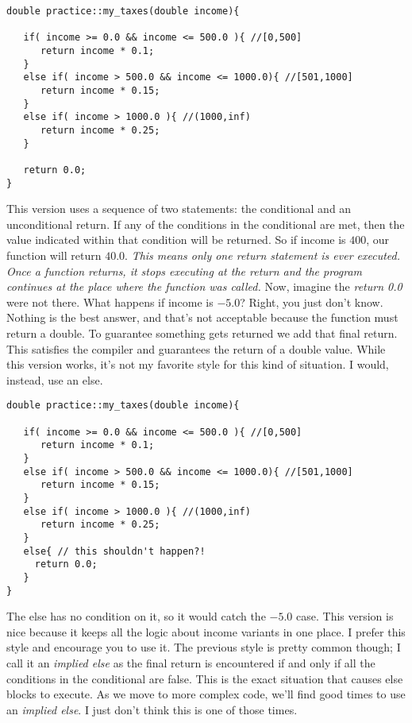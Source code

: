 \documentclass[]{tufte-handout}
\begin{document}
\begin{verbatim}
double practice::my_taxes(double income){

   if( income >= 0.0 && income <= 500.0 ){ //[0,500]
      return income * 0.1;
   }
   else if( income > 500.0 && income <= 1000.0){ //[501,1000]
      return income * 0.15;   
   }
   else if( income > 1000.0 ){ //(1000,inf) 
      return income * 0.25;   
   }
   
   return 0.0;
}
\end{verbatim}

This version uses a sequence of two statements: the conditional and an unconditional return.  If any of the conditions in the conditional are met, then the value indicated within that condition will be returned. So if income is $400$, our function will return $40.0$. \textit{This means only one return statement is ever executed. Once a function returns, it stops executing at the return and the program continues at the place where the function was called.}  Now, imagine the \textit{return 0.0} were not there. What happens if income is $-5.0$? Right, you just don't know. Nothing is the best answer, and that's not acceptable because the function must return a double. To guarantee something gets returned we add that final return. This satisfies the compiler and guarantees the return of a double value.  While this version works, it's not my favorite style for this kind of situation. I would, instead, use an else.
\begin{verbatim}
double practice::my_taxes(double income){

   if( income >= 0.0 && income <= 500.0 ){ //[0,500]
      return income * 0.1;
   }
   else if( income > 500.0 && income <= 1000.0){ //[501,1000]
      return income * 0.15;   
   }
   else if( income > 1000.0 ){ //(1000,inf) 
      return income * 0.25;   
   }
   else{ // this shouldn't happen?!
     return 0.0;
   }  
}
\end{verbatim}

The else has no condition on it, so it would catch the $-5.0$ case. This version is nice because it keeps all the logic about income variants in one place. I prefer this style and encourage you to use it. The previous style is pretty common though; I call it an \textit{implied else} as the final return is encountered if and only if all the conditions in the conditional are false. This is the exact situation that causes else blocks to execute. As we move to more complex code, we'll find good times to use an \textit{implied else}. I just don't think this is one of those times. 
\end{document}
